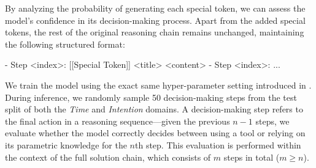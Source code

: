 By analyzing the probability of generating each special token, we can assess the model's confidence in its decision-making process. Apart from the added special tokens, the rest of the original reasoning chain remains unchanged, maintaining the following structured format:
\begin{tcolorbox}[colback=gray!5!white, colframe=gray!75!black, 
title=Step Format, boxrule=0.3mm, width=0.49\textwidth, arc=3mm, auto outer arc=true]
- Step <index>: [[Special Token]] <title>\newline
<content>\newline
- Step <index>: ...
\end{tcolorbox}

We train the model using the exact same hyper-parameter setting introduced in . During inference, we randomly sample 50 decision-making steps from the test split of both the \textit{Time} and \textit{Intention} domains. A decision-making step refers to the final action in a reasoning sequence—given the previous \( n-1 \) steps, we evaluate whether the model correctly decides between using a tool or relying on its parametric knowledge for the \( n \)th step. This evaluation is performed within the context of the full solution chain, which consists of \( m \) steps in total (\( m \geq n \)).
